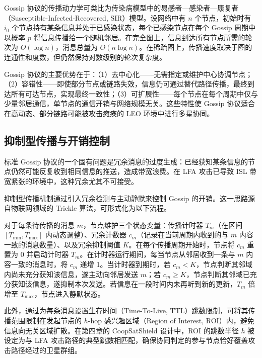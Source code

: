 Gossip 协议的传播动力学可类比为传染病模型中的易感者—感染者—康复者（Susceptible-Infected-Recovered, SIR）模型。设网络中有 $n$ 个节点，初始时有 $i_0$ 个节点持有某条信息并处于已感染状态，每个已感染节点在每个 Gossip 周期中以概率 $p$ 将信息传播给一个随机邻居。在完全图上，信息到达所有节点所需的轮次为 $O(\log n)$，消息总量为 $O(n \log n)$。在稀疏图上，传播速度取决于图的连通性和度数，但仍然保持对数级别的轮次复杂度。

Gossip 协议的主要优势在于：（1）去中心化——无需指定或维护中心协调节点；（2）容错性——即使部分节点或链路失效，信息仍可通过替代路径传播，最终到达所有可达节点，实现最终一致性；（3）可扩展性——每个节点在每个周期中仅与少量邻居通信，单节点的通信开销与网络规模无关。这些特性使 Gossip 协议适合在高动态、部分链路可能被攻击瘫痪的 LEO 环境中进行多星协同。

\subsection{抑制型传播与开销控制}

标准 Gossip 协议的一个固有问题是冗余消息的过度生成：已经获知某条信息的节点仍然可能反复收到相同信息的推送，造成带宽浪费。在 LFA 攻击已导致 ISL 带宽紧张的环境中，这种冗余尤其不可接受。

抑制型传播机制通过引入冗余检测与主动静默来控制 Gossip 的开销。这一思路源自物联网领域的 Trickle 算法，可形式化为以下流程。

对于每条待传播的消息 $m$，节点维护三个状态变量：传播计时器 $T_m$（在区间 $[T_{\min}, T_{\max}]$ 内动态调整）、冗余计数器 $c_m$（记录在当前周期内收到的与 $m$ 内容一致的消息数量）、以及冗余抑制阈值 $K$。在每个传播周期开始时，节点将 $c_m$ 重置为 0 并启动计时器 $T_m$。在计时器运行期间，每当节点从邻居收到一条与 $m$ 内容一致的消息时，将 $c_m$ 递增 1。当计时器到期时，若 $c_m < K$，节点判断其邻域内尚未充分获知该信息，遂主动向邻居发送 $m$；若 $c_m \geq K$，节点判断其邻域已充分获知该信息，遂抑制本次发送。若信息在一段时间内未再听到新的更新，$T_m$ 倍增至 $T_{\max}$，节点进入静默状态。

此外，通过为每条消息设置生存时间（Time-To-Live, TTL）跳数限制，可将其传播范围限制在发起节点的 $h$-hop 感兴趣区域（Region of Interest, ROI）内，避免信息向无关区域扩散。在第四章的 CoopSatShield 设计中，ROI 的跳数半径 $h$ 被设定为与 LFA 攻击路径的典型跳数相匹配，确保协同判定的参与节点恰好覆盖攻击路径经过的卫星群组。


